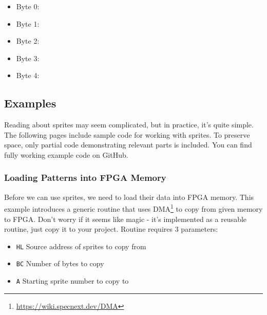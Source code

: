 \begin{itemize}[topsep=1pt,itemsep=1pt]
	\item Byte 0: 
	\item Byte 1: 
	\item Byte 2: 
	\item Byte 3: 
	\item Byte 4: 
\end{itemize}


\subsection{Examples}

Reading about sprites may seem complicated, but in practice, it's quite simple. The following pages include sample code for working with sprites. To preserve space, only partial code demonstrating relevant parts is included. You can find fully working example code on GitHub.


\pagebreak
\subsubsection{Loading Patterns into FPGA Memory}

Before we can use sprites, we need to load their data into FPGA memory. This example introduces a generic routine that uses DMA\footnote{\url{https://wiki.specnext.dev/DMA}} to copy from given memory to FPGA. Don't worry if it seems like magic - it's implemented as a reusable routine, just copy it to your project. Routine requires 3 parameters:

\begin{itemize}[topsep=1pt,itemsep=1pt]
	\item {\tt HL} Source address of sprites to copy from
	\item {\tt BC} Number of bytes to copy
	\item {\tt A} Starting sprite number to copy to
\end{itemize}

